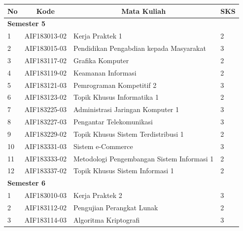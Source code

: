 \documentclass[a4paper,twoside]{article}
\begin{document}
\begin{enumerate}
\begin{enumerate}
\begin{table}[H]
\begin{tabular}{|p{0.5cm}|p{2.85cm}|p{4.95cm}|p{2.7cm}|}
		\end{tabular}
	\label{tab:kuliahpilihan}
\end{table}

\begin{table}[H]
	\centering
		\begin{tabular}{|p{0.5cm}|p{2.85cm}|p{4.95cm}|p{2.7cm}|}
			\hline
			\multicolumn{1}{|c|}{\textbf{No}} & \multicolumn{1}{c|}{\textbf{Kode}} & \multicolumn{1}{c|}{\textbf{Mata Kuliah}} & \multicolumn{1}{c|}{\textbf{SKS}} \\ \hline
			\multicolumn{4}{|l|}{\textbf{Semester 5}}                                \\ \hline
1   & AIF183013-02    & Kerja Praktek 1                            & 2   \\ \hline
2   & AIF183015-03    & Pendidikan Pengabdian kepada Masyarakat    & 3   \\ \hline
3   & AIF183117-02    & Grafika Komputer                           & 2   \\ \hline
4   & AIF183119-02    & Keamanan Informasi                         & 2   \\ \hline
5   & AIF183121-03    & Pemrograman Kompetitif 2                   & 3   \\ \hline
6   & AIF183123-02    & Topik Khusus Informatika 1                 & 2   \\ \hline
7   & AIF183225-03    & Administrasi Jaringan Komputer 1           & 3   \\ \hline
8   & AIF183227-03    & Pengantar Telekomunikasi                   & 3   \\ \hline
9   & AIF183229-02    & Topik Khusus Sistem Terdistribusi 1        & 2   \\ \hline
			10  & AIF183331-03    & Sistem e-Commerce                          & 3   \\ \hline
11  & AIF183333-02    & Metodologi Pengembangan Sistem Informasi 1 & 2   \\ \hline
12  & AIF183337-02    & Topik Khusus Sistem Informasi 1            & 2   \\ \hline
\multicolumn{4}{|l|}{\textbf{Semester 6}}                                \\ \hline
1   & AIF183010-03    & Kerja Praktek 2                            & 3   \\ \hline
2   & AIF183112-02    & Pengujian Perangkat Lunak                  & 2   \\ \hline
3   & AIF183114-03    & Algoritma Kriptografi                      & 3   \\ \hline

\end{tabular}
\end{table}
\end{enumerate}
\end{enumerate}
\end{document}
